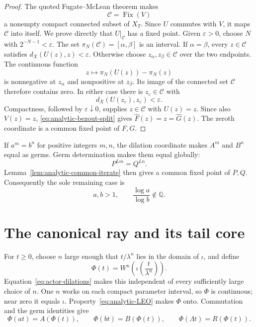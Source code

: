 \documentclass[11pt]{article}
\theoremstyle{definition}
\theoremstyle{remark}
\newcommand{\Fix}{\operatorname{Fix}}
\begin{document}
\begin{proof}
The quoted Fugate--McLean theorem makes
\[
 \mathcal C=\Fix(V)
\]
a nonempty compact connected subset of \(X_T\).  Since \(U\) commutes with
\(V\), it maps \(\mathcal C\) into itself.  We prove directly that
\(U|_{\mathcal C}\) has a fixed point.  Given \(\varepsilon>0\), choose
\(N\) with \(2^{-N-1}<\varepsilon\).  The set
\(\pi_N(\mathcal C)=[\alpha,\beta]\) is an interval.  If
\(\alpha=\beta\), every \(z\in\mathcal C\) satisfies
\(d_X(U(z),z)<\varepsilon\).  Otherwise choose
\(z_\alpha,z_\beta\in\mathcal C\) over the two endpoints.  The continuous
function
\[
 z\longmapsto\pi_N(U(z))-\pi_N(z)
\]
is nonnegative at \(z_\alpha\) and nonpositive at \(z_\beta\).  Its image of
the connected set \(\mathcal C\) therefore contains zero.  In either case
there is \(z_\varepsilon\in\mathcal C\) with
\[
 d_X(U(z_\varepsilon),z_\varepsilon)<\varepsilon.
\]
Compactness, followed by \(\varepsilon\downarrow0\), supplies
\(z\in\mathcal C\) with \(U(z)=z\).  Since also \(V(z)=z\),
\eqref{eq:analytic-bezout-split} gives
\(\widehat F(z)=z=\widehat G(z)\).  The zeroth coordinate is a common fixed
point of \(F,G\).
\end{proof}

If \(a^m=b^n\) for positive integers \(m,n\), the dilation coordinate makes
\(A^m\) and \(B^n\) equal as germs.  Germ determination makes them equal
globally:
\[
 P^{Lm}=Q^{Ln}.
\]
 Lemma~\ref{lem:analytic-common-iterate} then gives a common fixed point of
 \(P,Q\).
Consequently the sole remaining case is
\begin{equation}\label{eq:analytic-independent-scales}
 a,b>1,\qquad \frac{\log a}{\log b}\notin\mathbb Q.
\end{equation}

\section{The canonical ray and its tail core}

For \(t\geq0\), choose \(n\) large enough that \(t/\lambda^n\) lies in the
domain of \(\iota\), and define
\begin{equation}\label{eq:analytic-ray}
 \Phi(t)=W^n\left(\iota\left(\frac{t}{\lambda^n}\right)\right).
\end{equation}
Equation~\eqref{eq:actor-dilations} makes this independent of every
sufficiently large choice of \(n\).  One \(n\) works on each compact
parameter interval, so \(\Phi\) is continuous; near zero it equals
\(\iota\).  Property~\eqref{eq:analytic-LEO} makes \(\Phi\) onto.  Commutation
and the germ identities give
\begin{equation}\label{eq:analytic-ray-equivariance}
 \Phi(at)=A(\Phi(t)),\qquad
 \Phi(bt)=B(\Phi(t)),\qquad
 \Phi(\Lambda t)=R(\Phi(t)).
\end{equation}
\end{document}
